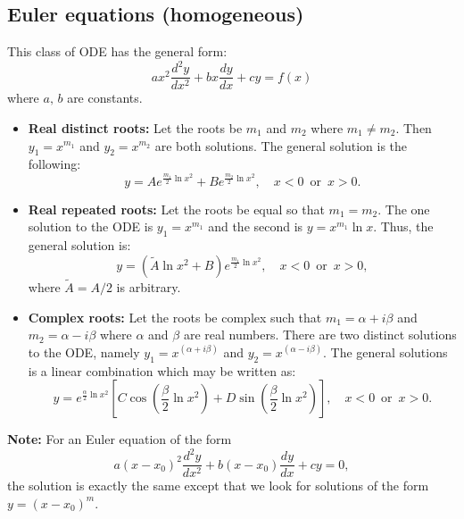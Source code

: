 \documentclass{article}
\begin{document}
\subsection{Euler equations (homogeneous)}
This class of ODE has the general form:
\begin{equation}
    ax^2\frac{d^2 y}{dx^2} + bx\frac{dy}{dx} + cy = f(x)
\end{equation}
where $a,\, b$ are constants. 
\begin{itemize}
    \item \textbf{Real distinct roots: }Let the roots be $m_1$ and $m_2$ where $m_1\neq m_2$. Then $y_1 = x^{m_1}$ and $y_2 = x^{m_2}$ are both solutions. The general solution is the following:
    \begin{equation}
        y = Ae^{\frac{m_1}{2}\ln{x^2}} + Be^{\frac{m_2}{2}\ln{x^2}},\quad x<0\,\text{ or }\, x>0.
    \end{equation}
    \item \textbf{Real repeated roots: }Let the roots be equal so that $m_1=m_2$. The one solution to the ODE is $y_1 = x^{m_1}$ and the second is $y = x^{m_1}\ln{x}$. Thus, the general solution is:
    \begin{equation}
        y = (\tilde{A}\ln{x^2}+B)e^{\frac{m_1}{2}\ln{x^2}},\quad x<0\,\text{ or }\,x>0,
    \end{equation}
    where $\tilde{A} = A/2$ is arbitrary.
    \item \textbf{Complex roots: }Let the roots be complex such that $m_1 = \alpha+i\beta$ and $m_2 = \alpha - i\beta$ where $\alpha$ and $\beta$ are real numbers. There are two distinct solutions to the ODE, namely $y_1 = x^{(\alpha + i\beta)}$ and $y_2 = x^{(\alpha - i\beta)}$. The general solutions is a linear combination which may be written as:
    \begin{equation}
        y = e^{\frac{\alpha}{2}\ln{x^2}}\left[ C\cos{\left( \frac{\beta}{2}\ln{x^2} \right)} + D\sin{\left( \frac{\beta}{2}\ln{x^2} \right)} \right],\quad x<0\,\text{ or }\, x>0.
    \end{equation}
\end{itemize}
\textbf{Note: }For an Euler equation of the form
\begin{equation}
    a(x-x_0)^2\frac{d^2 y}{dx^2} + b(x-x_0)\frac{dy}{dx} + cy = 0,
\end{equation}
the solution is exactly the same except that we look for solutions of the form $y = (x-x_0)^m$.
\end{document}
